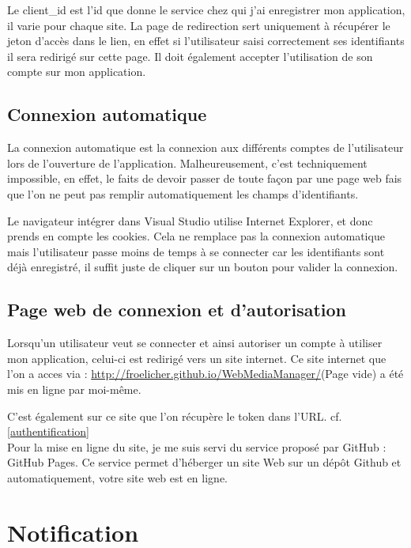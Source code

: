\documentclass[11pt]{report} %
\begin{document}
	Le client\_id est l'id que donne le service chez qui j'ai enregistrer mon application, il varie pour chaque site. 
	La page de redirection sert uniquement à récupérer le jeton d'accès dans le lien, en effet si l'utilisateur saisi correctement ses identifiants il sera redirigé sur cette page. Il doit également accepter l'utilisation de son compte sur mon application.

	\subsection{Connexion automatique}
	La connexion automatique est la connexion aux différents comptes de l'utilisateur lors de l'ouverture de l'application. Malheureusement, c'est techniquement impossible, en effet, le faits de devoir passer de toute façon par une page web fais que l'on ne peut pas remplir automatiquement les champs d'identifiants.
	
	Le navigateur intégrer dans Visual Studio utilise Internet Explorer, et donc prends en compte les cookies. Cela ne remplace pas la connexion automatique mais l'utilisateur passe moins de temps à se connecter car les identifiants sont déjà enregistré, il suffit juste de cliquer sur un bouton pour valider la connexion.
	
	\subsection{Page web de connexion et d'autorisation}
	Lorsqu'un utilisateur veut se connecter et ainsi autoriser un compte à utiliser mon application, celui-ci est redirigé vers un site internet. Ce site internet que l'on a acces via : \url{http://froelicher.github.io/WebMediaManager/}(Page vide) a été mis en ligne par moi-même.
	
	C'est également sur ce site que l'on récupère le token dans l'URL. cf. \ref{authentification}\\
	
	Pour la mise en ligne du site, je me suis servi du service proposé par GitHub : GitHub Pages. Ce service permet d'héberger un site Web sur un dépôt Github et automatiquement, votre site web est en ligne.\\
	
	\newpage
	
	\section{Notification}
	
\end{document}
